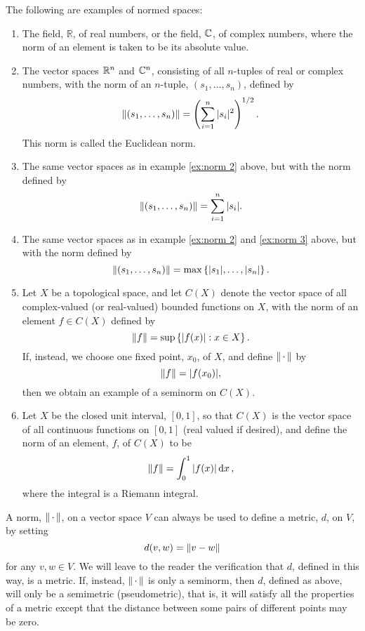 \begin{examples}
The following are examples of normed spaces:
\begin{enumerate}
    \item\label{ex:norm 1}
    The field, $\mathbb{R}$, of real numbers, or the field, $\mathbb{C}$, of complex numbers, where the norm of an element is taken to be its absolute value.
    
    \item\label{ex:norm 2}
    The vector spaces $\mathbb{R}^n$ and $\mathbb{C}^n$, consisting of all $n$-tuples of real or complex numbers, with the norm of an $n$-tuple, $(s_1,\dots,s_n)$, defined by \[\norm{(s_1,\dots,s_n)}=\left(\sum_{i=1}^n|s_i|^2\right)^{1/2}.\] This norm is called the Euclidean norm.
    
    \item\label{ex:norm 3}
    The same vector spaces as in example \ref{ex:norm 2} above, but with the norm defined by \[\norm{(s_1,\dots,s_n)}=\sum_{i=1}^n|s_i|.\]
    
    \item The same vector spaces as in example \ref{ex:norm 2} and \ref{ex:norm 3} above, but with the norm defined by \[\norm{(s_1,\dots,s_n)}=\max\left\{|s_1|,\dots,|s_n|\right\}.\]
    
    \item\label{ex:norm last}
    Let $X$ be a topological space, and let $C(X)$ denote the vector space of all complex-valued (or real-valued) bounded functions on $X$, with the norm of an element $f\in C(X)$ defined by \[\norm{f}=\sup\left\{|f(x)|:x\in X\right\}.\] If, instead, we choose one fixed point, $x_0$, of $X$, and define $\norm{\,\cdot\,}$ by \[\norm{f}=|f(x_0)|,\] then we obtain an example of a seminorm on $C(X)$.
    
    \item\label{ex:norm non banach}
    Let $X$ be the closed unit interval, $[0,1]$, so that $C(X)$ is the vector space of all continuous functions on $[0,1]$ (real valued if desired), and define the norm of an element, $f$, of $C(X)$ to be \[\norm{f}=\int_0^1|f(x)|\dd{x},\] where the integral is a Riemann integral.
\end{enumerate}
\end{examples}

A norm, $\norm{\,\cdot\,}$, on a vector space $V$ can always be used to define a metric, $d$, on $V$, by setting \[d(v,w)=\norm{v-w}\] for any $v,w\in V$. We will leave to the reader the verification that $d$, defined in this way, is a metric. If, instead, $\norm{\,\cdot\,}$ is only a seminorm, then $d$, defined as above, will only be a semimetric (pseudometric), that is, it will satisfy all the properties of a metric except that the distance between some pairs of different points may be zero.

